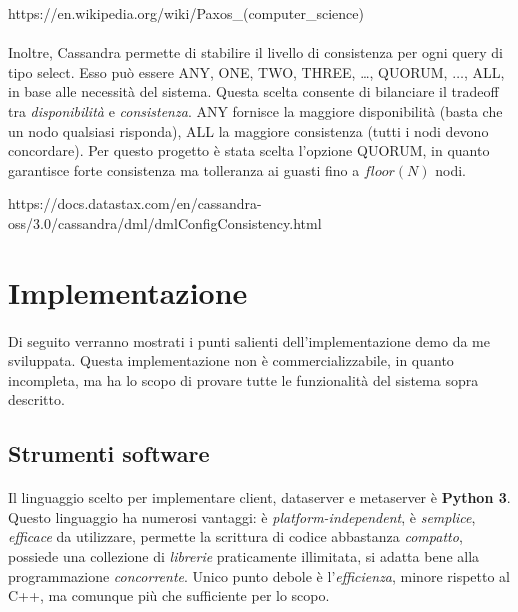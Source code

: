 \documentclass[11pt,a4paper,english]{article}
\begin{document}
https://en.wikipedia.org/wiki/Paxos\_(computer\_science)  

\paragraph{} Inoltre, Cassandra permette di stabilire il livello di consistenza per ogni query di tipo select. Esso può essere ANY, ONE, TWO, THREE, \dots, QUORUM, $\dots$, ALL, in base alle necessità del sistema. Questa scelta consente di bilanciare il tradeoff tra \emph{disponibilità} e \emph{consistenza}. ANY fornisce la maggiore disponibilità (basta che un nodo qualsiasi risponda), ALL la maggiore consistenza (tutti i nodi devono concordare). Per questo progetto è stata scelta l'opzione QUORUM, in quanto garantisce forte consistenza ma tolleranza ai guasti fino a $floor(N)$ nodi. 

https://docs.datastax.com/en/cassandra-oss/3.0/cassandra/dml/dmlConfigConsistency.html


\section{Implementazione}

\paragraph{} Di seguito verranno mostrati i punti salienti dell'implementazione demo da me sviluppata. Questa implementazione non è commercializzabile, in quanto incompleta, ma ha lo scopo di provare tutte le funzionalità del sistema sopra descritto. 

\subsection{Strumenti software}

\paragraph{} Il linguaggio scelto per implementare client, dataserver e metaserver è \textbf{Python 3}. Questo linguaggio ha numerosi vantaggi: è \emph{platform-independent}, è \emph{semplice}, \emph{efficace} da utilizzare, permette la scrittura di codice abbastanza \emph{compatto}, possiede una collezione di \emph{librerie} praticamente illimitata, si adatta bene alla programmazione \emph{concorrente}. Unico punto debole è l'\emph{efficienza}, minore rispetto al C++, ma comunque più che sufficiente per lo scopo. 
\end{document}
